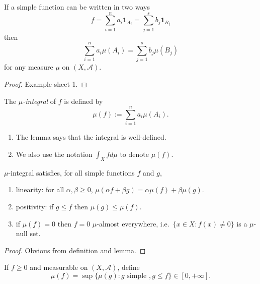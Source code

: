 \documentclass[a4paper]{article}
\begin{document}
\begin{lemma}
  If a simple function can be written in two ways
  \[
    f = \sum_{i = 1}^n a_i \mathbf 1_{A_i} = \sum_{j = 1}^s b_j \mathbf 1_{B_j}
  \]
  then
  \[
    \sum_{i = 1}^n a_i \mu(A_i) = \sum_{j = 1}^s b_j \mu(B_j)
  \]
  for any measure \(\mu\) on \((X, \mathcal A)\).
\end{lemma}

\begin{proof}
  Example sheet 1.
\end{proof}

\begin{definition}
  The \emph{\(\mu\)-integral} of \(f\) is defined by
  \[
    \mu(f) := \sum_{i = 1}^n a_i \mu(A_i).
  \]
\end{definition}

\begin{remark}\leavevmode
  \begin{enumerate}
  \item The lemma says that the integral is well-defined.
  \item We also use the notation \(\int_X f d\mu\) to denote \(\mu(f)\).
  \end{enumerate}
\end{remark}

\begin{proposition}
  \(\mu\)-integral satisfies, for all simple functions \(f\) and \(g\),
\begin{enumerate}
\item linearity: for all \(\alpha, \beta \geq 0\), \(\mu(\alpha f + \beta g) = \alpha \mu(f) + \beta \mu(g)\).
\item positivity: if \(g \leq f\) then \(\mu(g) \leq \mu(f)\).
\item if \(\mu(f) = 0\) then \(f = 0\) \(\mu\)-almost everywhere, i.e.\ \(\{x \in X: f(x) \neq 0\}\) is a \(\mu\)-null set.
\end{enumerate}
\end{proposition}

\begin{proof}
  Obvious from definition and lemma.
\end{proof}

\begin{definition}
  If \(f \geq 0\) and measurable on \((X, \mathcal A)\), define
  \[
    \mu(f) = \sup \{\mu(g): g \text{ simple }, g \leq f\} \in [0, +\infty].
  \]
\end{definition}
\end{document}
